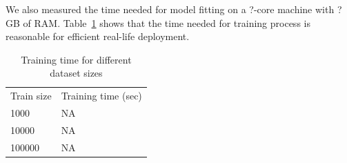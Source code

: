 We also measured the time needed for model fitting on a ?-core machine with ? GB of RAM. Table~\ref{training_time} shows that the time needed for training process is reasonable for efficient real-life deployment.

\begin{table}[htbp]
\begin{tabular}{ll}
Train size          & Training time (sec) \\
1000  & NA          \\
10000 & NA          \\
100000 & NA          
\end{tabular}
\caption{Training time for different dataset sizes}
\label{training_time}
\end{table}